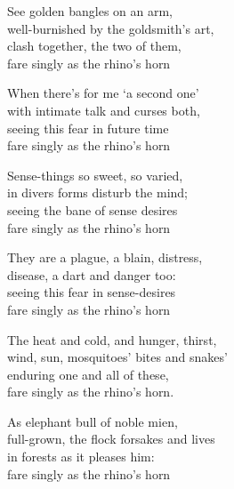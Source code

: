 \begin{MyDescription}{}  	
See golden bangles on an arm,\\
well-burnished by the goldsmith's art,\\
clash together, the two of them,\\
fare singly as the rhino's horn
\end{MyDescription}
   
\begin{MyDescription}{}  	
When there's for me `a second one'\\
with intimate talk and curses both,\\
seeing this fear in future time\\
fare singly as the rhino's horn
\end{MyDescription}

\begin{MyDescription}{}  	
Sense-things so sweet, so varied,\\
in divers forms disturb the mind;\\
seeing the bane of sense desires\\
fare singly as the rhino's horn
\end{MyDescription}

\begin{MyDescription}{}  	
They are a plague, a blain, distress,\\
disease, a dart and danger too:\\
seeing this fear in sense-desires\\
fare singly as the rhino's horn
\end{MyDescription}
   
\begin{MyDescription}{}  	
The heat and cold, and hunger, thirst,\\
wind, sun, mosquitoes' bites and snakes'\\
enduring one and all of these,\\
fare singly as the rhino's horn.
\end{MyDescription}
   
\begin{MyDescription}{}  	
As elephant bull of noble mien,\\
full-grown, the flock forsakes and lives\\
in forests as it pleases him:\\
fare singly as the rhino's horn
\end{MyDescription}
   
